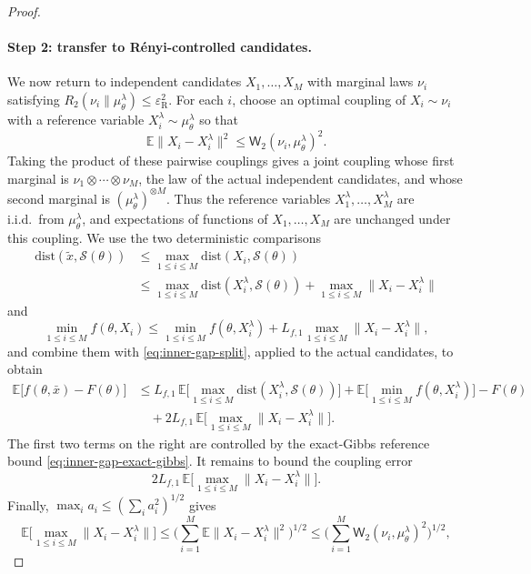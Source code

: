 \documentclass{article}
\theoremstyle{normaltheorem}
\newcommand{\gibbs}{\mu}
\newcommand{\calS}{\mathcal{S}}
\begin{document}
\begin{proof}
	\paragraph{Step 2: transfer to R\'enyi-controlled candidates.}
		We now return to independent candidates $X_1,\dots,X_M$ with marginal laws $\nu_i$ satisfying
		$R_2(\nu_i\|\gibbs_\theta^\lambda)\le\varepsilon_{\mathrm R}^2$.
		For each $i$, choose an optimal coupling of \(X_i\sim\nu_i\) with a reference variable
		\(X_i^\lambda\sim\gibbs_\theta^\lambda\) so that
		\[
		\mathbb E\|X_i-X_i^\lambda\|^2
		\le \mathsf W_2(\nu_i,\gibbs_\theta^\lambda)^2.
		\]
		Taking the product of these pairwise couplings gives a joint coupling whose first marginal is
		\(\nu_1\otimes\cdots\otimes\nu_M\), the law of the actual independent candidates, and whose second marginal is
		\((\gibbs_\theta^\lambda)^{\otimes M}\). Thus the reference variables \(X_1^\lambda,\ldots,X_M^\lambda\) are i.i.d.\
		from \(\gibbs_\theta^\lambda\), and expectations of functions of \(X_1,\ldots,X_M\) are unchanged under this coupling.
	We use the two deterministic comparisons
	\[
	\begin{aligned}
	\mathrm{dist}(\tilde x,\calS(\theta))
	&\le \max_{1\le i\le M}\mathrm{dist}(X_i,\calS(\theta))\\
	&\le \max_{1\le i\le M}\mathrm{dist}(X_i^\lambda,\calS(\theta))
	+\max_{1\le i\le M}\|X_i-X_i^\lambda\|
	\end{aligned}
	\]
	and
	\[
	\min_{1\le i\le M}f(\theta,X_i)
	\le \min_{1\le i\le M}f(\theta,X_i^\lambda)+L_{f,1}\max_{1\le i\le M}\|X_i-X_i^\lambda\|,
	\]
	and combine them with \eqref{eq:inner-gap-split}, applied to the actual candidates, to obtain
	\begin{align*}
	\mathbb E\big[f(\theta,\bar x)-F(\theta)\big]
	&\le
	L_{f,1}\,\mathbb E\Big[\max_{1\le i\le M}\mathrm{dist}(X_i^\lambda,\calS(\theta))\Big]
	+\mathbb E\Big[\min_{1\le i\le M} f(\theta,X_i^\lambda)\Big]-F(\theta)\\
	&\quad
	+2L_{f,1}\,\mathbb E\Big[\max_{1\le i\le M}\|X_i-X_i^\lambda\|\Big].
	\end{align*}
	The first two terms on the right are controlled by the exact-Gibbs reference bound \eqref{eq:inner-gap-exact-gibbs}. It remains
	to bound the coupling error
	\[
	2L_{f,1}\,\mathbb E\Big[\max_{1\le i\le M}\|X_i-X_i^\lambda\|\Big].
	\]
	Finally, $\max_i a_i\le (\sum_i a_i^2)^{1/2}$ gives
	\[
	\mathbb E\Big[\max_{1\le i\le M}\|X_i-X_i^\lambda\|\Big]
	\le
	\Big(\sum_{i=1}^M \mathbb E\|X_i-X_i^\lambda\|^2\Big)^{1/2}
	\le
	\Bigg(\sum_{i=1}^M \mathsf W_2(\nu_i,\gibbs_\theta^\lambda)^2\Bigg)^{1/2},
\]
\end{proof}
\end{document}
